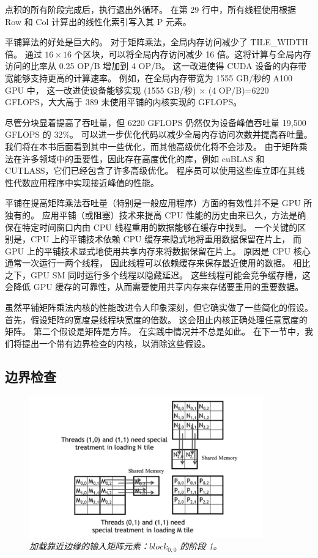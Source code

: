 点积的所有阶段完成后，执行退出外循环。 在第 29 行中，所有线程使用根据 Row 和 Col 计算出的线性化索引写入其 P 元素。

平铺算法的好处是巨大的。 对于矩阵乘法，全局内存访问减少了 TILE\_WIDTH 倍。 
通过 $16 \times 16$ 个区块，可以将全局内存访问减少 16 倍。这将计算与全局内存访问的比率从 0.25 OP/B 增加到 4 OP/B。 
这一改进使得 CUDA 设备的内存带宽能够支持更高的计算速率。 
例如，在全局内存带宽为 1555 GB/秒的 A100 GPU 中，
这一改进使设备能够实现 (1555 GB/秒) × (4 OP/B)=6220 GFLOPS，大大高于 389 未使用平铺的内核实现的 GFLOPS。

尽管分块显着提高了吞吐量，但 6220 GFLOPS 仍然仅为设备峰值吞吐量 19,500 GFLOPS 的 32\%。 
可以进一步优化代码以减少全局内存访问次数并提高吞吐量。 我们将在本书后面看到其中一些优化，而其他高级优化将不会涉及。 
由于矩阵乘法在许多领域中的重要性，因此存在高度优化的库，例如 cuBLAS 和 CUTLASS，它们已经包含了许多高级优化。 
程序员可以使用这些库立即在其线性代数应用程序中实现接近峰值的性能。

平铺在提高矩阵乘法吞吐量（特别是一般应用程序）方面的有效性并不是 GPU 所独有的。 
应用平铺（或阻塞）技术来提高 CPU 性能的历史由来已久，方法是确保在特定时间窗口内由 CPU 线程重用的数据能够在缓存中找到。 
一个关键的区别是，CPU 上的平铺技术依赖 CPU 缓存来隐式地将重用数据保留在片上，
而 GPU 上的平铺技术显式地使用共享内存来将数据保留在片上。 原因是 CPU 核心通常一次运行一两个线程，
因此线程可以依赖缓存来保存最近使用的数据。 相比之下，GPU SM 同时运行多个线程以隐藏延迟。 
这些线程可能会竞争缓存槽，这会降低 GPU 缓存的可靠性，从而需要使用共享内存来存储要重用的重要数据。

虽然平铺矩阵乘法内核的性能改进令人印象深刻，但它确实做了一些简化的假设。 首先，假设矩阵的宽度是线程块宽度的倍数。 
这会阻止内核正确处理任意宽度的矩阵。 第二个假设是矩阵是方阵。 在实践中情况并不总是如此。 
在下一节中，我们将提出一个带有边界检查的内核，以消除这些假设。

\subsection{边界检查}
\begin{figure}[H]
	\centering
	\includegraphics[width=0.9\textwidth]{figs/F5.11.png}
	\caption{\textit{加载靠近边缘的输入矩阵元素：$block_{0,0}$ 的阶段 1。}}
\end{figure}

